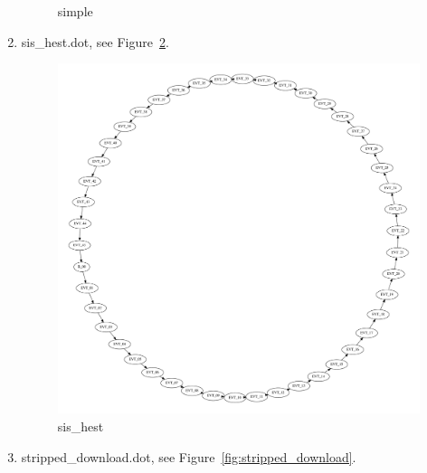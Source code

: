 \documentclass[12pt,a4paper]{report}
\begin{document}
\begin{enumerate}
\begin{figure}
        \caption{simple}
        \label{fig:simple}
    \end{figure}
\item sis\_hest.dot, see Figure~\ref{fig:sis_hest}.
    \begin{figure}
        \centering
        \includegraphics*[width=1.0\textwidth,keepaspectratio]{TestPattern/sis_hest.pdf}
        \caption{sis\_hest}
        \label{fig:sis_hest}
    \end{figure}
\item stripped\_download.dot, see Figure~\ref{fig:stripped_download}.
    \begin{figure}
        \centering

\end{figure}
\end{enumerate}
\end{document}
